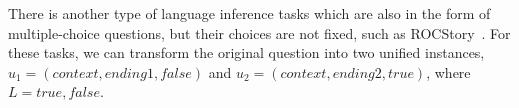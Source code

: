 There is another type of language inference tasks which are also in 
the form of multiple-choice questions, but their choices are not fixed,
such as ROCStory~\cite{mostafazadeh2016corpus}. 
For these tasks, we can transform the original question into two 
unified instances, 
$u_1=(context, ending1, false)$ and $u_2=(context, ending2, true)$, 
where $L = {true, false}$.

 

